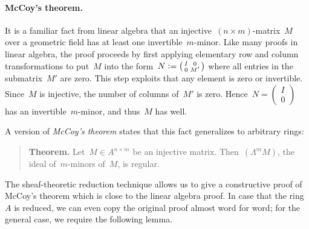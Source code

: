 \documentclass{ws-rv9x6}
\newcommand{\defeq}{\vcentcolon=}
\renewcommand{\_}{\mathpunct{.}}
\newcommand{\?}{\,{:}\,}
\begin{document}
\paragraph{McCoy's theorem.}\label{par:mccoy}
It is a familiar fact from linear algebra that an injective~$(n \times
m)$-matrix~$M$ over a geometric field has at least one invertible~$m$-minor.
Like many proofs in linear algebra, the proof proceeds by first applying
elementary row and column transformations to put~$M$ into the form~$N \defeq
\left(\begin{smallmatrix}I&0\\0&M'\end{smallmatrix}\right)$ where all entries
in the submatrix~$M'$ are zero. This step exploits
that any element is zero or invertible. Since~$M$ is injective, the number of columns of~$M'$ is zero.
Hence~$N = \left(\begin{smallmatrix}I\\0\end{smallmatrix}\right)$ has an
invertible~$m$-minor, and thus~$M$ has well.

A version of \emph{McCoy's theorem} states that this fact
generalizes to arbitrary rings:

\begin{quote}
\textbf{Theorem.} Let~$M \in A^{n \times m}$ be an injective matrix.
Then~$(\Lambda^m M)$, the ideal of~$m$-minors of~$M$, is regular.
\end{quote}

The sheaf-theoretic reduction technique allows us to give a constructive proof
of McCoy's theorem which is close to the linear algebra proof. In case that the
ring~$A$ is reduced, we can even copy the original proof almost word for word;
for the general case, we require the following lemma.
\end{document}
